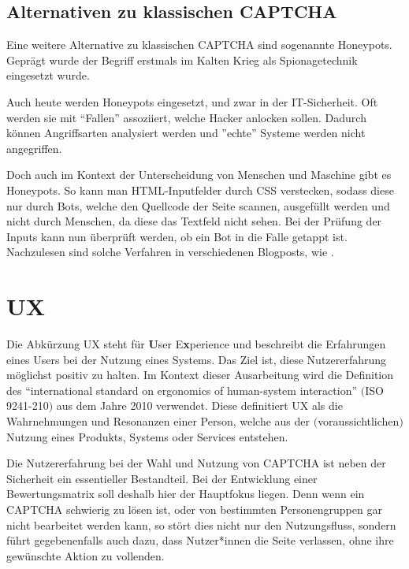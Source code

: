 \subsection{Alternativen zu klassischen CAPTCHA}
Eine weitere Alternative zu klassischen CAPTCHA sind sogenannte Honeypots. 
Geprägt wurde der Begriff erstmals im Kalten Krieg als Spionagetechnik eingesetzt wurde. \cite[p.2]{joshi:2011} 

Auch heute werden Honeypots eingesetzt, und zwar in der IT-Sicherheit. 
Oft werden sie mit ``Fallen'' assoziiert, welche Hacker anlocken sollen. 
Dadurch können Angriffsarten analysiert werden und ''echte'' Systeme werden nicht angegriffen.

Doch auch im Kontext der Unterscheidung von Menschen und Maschine gibt es Honeypots. 
So kann man HTML-Inputfelder durch CSS verstecken, sodass diese nur durch Bots, welche den Quellcode der Seite scannen, ausgefüllt werden 
und nicht durch Menschen, da diese das Textfeld nicht sehen. 
Bei der Prüfung der Inputs kann nun überprüft werden, ob ein Bot in die Falle getappt ist. 
Nachzulesen sind solche Verfahren in verschiedenen Blogposts, wie \cite{perry:2019}.


\section{UX}

Die Abkürzung UX steht für \textbf{U}ser E\textbf{x}perience und beschreibt die Erfahrungen eines Users bei der Nutzung eines Systems. 
Das Ziel ist, diese Nutzererfahrung möglichst positiv zu halten. 
Im Kontext dieser Ausarbeitung wird die Definition des  ``international standard on ergonomics of human-system interaction'' $($ISO 9241-210$)$
aus dem Jahre 2010 verwendet. 
Diese definitiert UX als die Wahrnehmungen und Resonanzen einer Person, 
welche aus der $($voraussichtlichen$)$ Nutzung eines Produkts, Systems oder Services entstehen. \cite[p.1629]{berni_borgianni_2021}

Die Nutzererfahrung bei der Wahl und Nutzung von CAPTCHA ist neben der Sicherheit ein essentieller Bestandteil.
Bei der Entwicklung einer Bewertungsmatrix soll deshalb hier der Hauptfokus liegen.
Denn wenn ein CAPTCHA schwierig zu lösen ist, oder von bestimmten Personengruppen gar nicht bearbeitet werden kann, so stört dies nicht nur den Nutzungsfluss,
sondern führt gegebenenfalls auch dazu, dass Nutzer*innen die Seite verlassen, ohne ihre gewünschte Aktion zu vollenden. 

